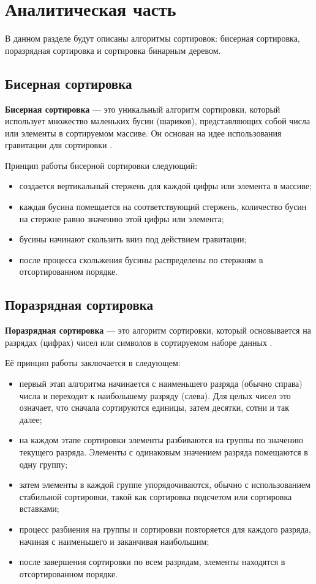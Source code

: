 \chapter{Аналитическая часть}
В данном разделе будут описаны алгоритмы сортировок: бисерная сортировка, поразрядная сортировка и сортировка бинарным деревом.

\section{Бисерная сортировка}
\textbf{Бисерная сортировка} --- это уникальный алгоритм сортировки, который использует множество маленьких бусин (шариков), представляющих собой числа или элементы в сортируемом массиве.
Он основан на идее использования гравитации для сортировки \cite{beadsort}.

Принцип работы бисерной сортировки следующий:
\begin{itemize}
	\item создается вертикальный стержень для каждой цифры или элемента в массиве;
	\item каждая бусина помещается на соответствующий стержень, количество бусин на стержне равно значению этой цифры или элемента;
	\item бусины начинают скользить вниз под действием гравитации;
	\item после процесса скольжения бусины распределены по стержням в отсортированном порядке.
\end{itemize}

\section{Поразрядная сортировка}
\textbf{Поразрядная сортировка} --- это алгоритм сортировки, который основывается на разрядах (цифрах) чисел или символов в сортируемом наборе данных \cite{radixsort}.

Её принцип работы заключается в следующем:

\begin{itemize}
	\item первый этап алгоритма начинается с наименьшего разряда (обычно справа) числа и переходит к наибольшему разряду (слева). Для целых чисел это означает, что сначала сортируются единицы, затем десятки, сотни и так далее;
	\item на каждом этапе сортировки элементы разбиваются на группы по значению текущего разряда. Элементы с одинаковым значением разряда помещаются в одну группу;
	\item затем элементы в каждой группе упорядочиваются, обычно с использованием стабильной сортировки, такой как сортировка подсчетом или сортировка вставками;
	\item процесс разбиения на группы и сортировки повторяется для каждого разряда, начиная с наименьшего и заканчивая наибольшим;
	\item после завершения сортировки по всем разрядам, элементы находятся в отсортированном порядке.
\end{itemize}

